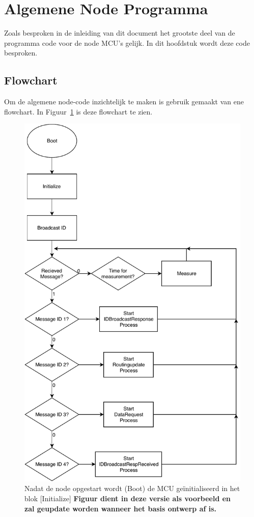 \documentclass[a4paper, 11pt]{article}
\begin{document}
\section{Algemene Node Programma}
Zoals besproken in de inleiding van dit document het grootste deel van de programma code voor de node MCU's gelijk. In dit hoofdstuk wordt deze code besproken. 
\subsection{Flowchart}
Om de algemene node-code inzichtelijk te maken is gebruik gemaakt van ene flowchart. In Figuur~\ref{fig:flowchart} is deze flowchart te zien.
\begin{figure}[!h]
	\centering	
	\includegraphics[width=.5\textwidth, keepaspectratio]{media/Pflow.pdf}
    \caption{Nadat de node opgestart wordt (Boot) de MCU geïnitialiseerd in het blok [Initialize]
     \textbf{Figuur dient in deze versie als voorbeeld en zal geupdate worden wanneer het basis ontwerp af is.}}
    \label{fig:flowchart}
\end{figure}
\end{document}
